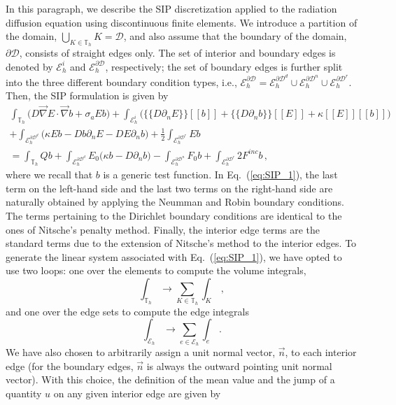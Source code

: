 \documentclass[preprint,10pt]{elsarticle}
\newcommand{\grad}{\vec{\nabla}}
\newcommand{\jmp}[1]{[\![#1]\!]}                     %
\newcommand{\mvl}[1]{\{\!\!\{#1\}\!\!\}}             %
\newcommand{\D}{\mathcal{D}}
\newcommand{\vn}{\vec{n}}
\newcommand{\EI}{\mathcal{E}_h^i}
\newcommand{\ED}{\mathcal{E}_h^{\partial \D^d}}
\newcommand{\EN}{\mathcal{E}_h^{\partial \D^n}}
\newcommand{\ER}{\mathcal{E}_h^{\partial \D^r}}
\newcommand{\eqt}[1]{Eq.~(\ref{#1})}                     %
\newcommand{\tf}{b}
\begin{document}
In this paragraph, we describe the SIP discretization \cite{DouglasN.Arnold2002,Kanschat2007} applied to the 
radiation diffusion equation using discontinuous finite elements. 
We introduce a partition
of the domain, $\bigcup\nolimits_{K\in \mathbb{T}_{h}}K=\D$, and also assume
that the boundary of the domain, $\partial \D$, consists of straight edges only. The 
set of interior and boundary edges is denoted by $\EI$ and $\mathcal{E}_h^{\partial\D}$,
respectively; the set of boundary edges is further split into the three different boundary 
condition types, i.e., $\mathcal{E}_h^{\partial\D} = \ED \cup \EN \cup \ER$. 
Then, the SIP formulation is given by
\begin{multline}
\label{eq:SIP_1}
\int_{\mathbb{T}_{h}} \Big( D \grad E \cdot \grad \tf + \sigma_a E \tf \Big)
+ \int_{\EI} \Big( \mvl{D\partial_n E} \jmp{\tf}  + \mvl{D\partial_n \tf} \jmp{E} + \kappa\jmp{E}\jmp{\tf} \Big)
\\
+ \int_{\ED} \Big( \kappa E \tf -D\tf \partial_n E  -D E \partial_n \tf \Big)
+ \frac{1}{2} \int_{\ER}  E \tf  
\\
=
\int_{\mathbb{T}_{h}} Q \tf 
+ \int_{\ED} E_0 \Big( \kappa \tf  -D \partial_n \tf  \Big)
- \int_{\EN} F_0 \tf  
+ \int_{\ER} 2 F^{inc} \tf  \, ,
\end{multline}
where we recall that $\tf$ is a generic test function. 
In \eqt{eq:SIP_1}, the last term on the left-hand side and the last two terms on the right-hand side 
are naturally obtained by applying the Neumman and Robin boundary conditions. The terms pertaining 
to the Dirichlet boundary conditions are identical to the ones of Nitsche's penalty method. 
Finally, the interior edge terms are the standard terms due to the extension of Nitsche's method to 
the interior edges.
To generate the linear system associated with \eqt{eq:SIP_1}, 
we have opted to use two loops: one over the elements to compute the volume integrals,
\begin{equation}
\int_{\mathbb{T}_{h}} \longrightarrow \sum_{K \in \mathbb{T}_{h}} \int_{K} \, ,
\end{equation}
and one over the edge sets to compute the edge integrals
\begin{equation}
\int_{\mathcal{E}_h} \longrightarrow \sum_{e \in \mathcal{E}_h} \int_{e} \, .
\end{equation}
We have also chosen to arbitrarily assign a unit normal vector, $\vn$, to each interior edge (for the boundary edges,
$\vn$ is always the outward pointing unit normal vector). With this choice, the definition of the mean value and the jump of a quantity $u$ on any given interior edge are given by
\end{document}
